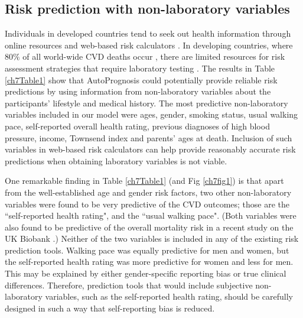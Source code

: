 \documentclass [PhD] {uclathes}
\begin{document}
\subsection*{Risk prediction with non-laboratory variables}
Individuals in developed countries tend to seek out health information through online resources and web-based risk calculators \cite{hesse2005trust}. In developing countries, where 80$\%$ of all world-wide CVD deaths occur \cite{gaziano2008laboratory}, there are limited resources for risk assessment strategies that require laboratory testing \cite{gaziano2008laboratory,mendis2007world}. The results in Table \ref{ch7Table1} show that AutoPrognosis could potentially provide reliable risk predictions by using information from non-laboratory variables about the participants' lifestyle and medical history. The most predictive non-laboratory variables included in our model were ages, gender, smoking status, usual walking pace, self-reported overall health rating, previous diagnoses of high blood pressure, income, Townsend index and parents' ages at death. Inclusion of such variables in web-based risk calculators can help provide reasonably accurate risk predictions when obtaining laboratory variables is not viable.

One remarkable finding in Table \ref{ch7Table1} (and Fig \ref{ch7fig1}) is that apart from the well-established age and gender risk factors, two other non-laboratory variables were found to be very predictive of the CVD outcomes; those are the ``self-reported health rating", and the ``usual walking pace". (Both variables were also found to be predictive of the overall mortality risk in a recent study on the UK Biobank \cite{ganna20155}.) Neither of the two variables is included in any of the existing risk prediction tools. Walking pace was equally predictive for men and women, but the self-reported health rating was more predictive for women and less for men. This may be explained by either gender-specific reporting bias or true clinical differences. Therefore, prediction tools that would include subjective non-laboratory variables, such as the self-reported health rating, should be carefully designed in such a way that self-reporting bias is reduced.     
\end{document}
